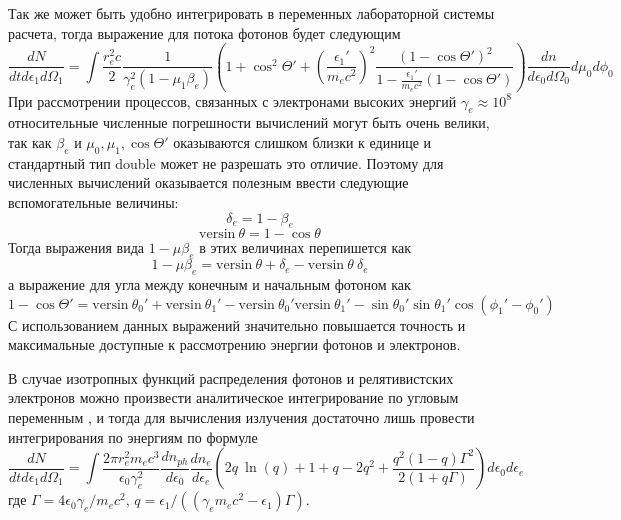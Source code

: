 Так же может быть удобно интегрировать в переменных лабораторной системы расчета, тогда выражение для потока фотонов будет следующим
\begin{equation}\label{compton_labframe}
	\frac{dN}{dt d\epsilon_1 d\Omega_1}=\int \frac{r_e^2 c}{2} \frac{1}{\gamma_e^2(1-\mu_1\beta_e)} (1 + \cos^2\Theta'+(\frac{\epsilon_1'}{m_e c^2})^2\frac{(1-\cos\Theta')^2}{1-\frac{\epsilon_1'}{m_e c^2}(1 - \cos \Theta')})\frac{dn}{d\epsilon_0 d\Omega_0}d\mu_0 d\phi_0
\end{equation}
При рассмотрении процессов, связанных с электронами высоких энергий $\gamma_e \approx 10^8$ относительные численные погрешности вычислений могут быть очень велики, так как $\beta_e$ и $\mu_0, \mu_1, \cos \Theta'$ оказываются слишком близки к единице и стандартный тип double может не разрешать это отличие. Поэтому для численных вычислений оказывается полезным ввести следующие вспомогательные величины:
\begin{equation}
	\delta_e = 1 - \beta_e
\end{equation}
\begin{equation}
	\text{versin}~\theta = 1 - \cos \theta
\end{equation}
Тогда выражения вида $1 - \mu \beta_e$ в этих величинах перепишется как
\begin{equation}
	1 - \mu \beta_e =\text{versin}~\theta + \delta_e - \text{versin}~\theta~\delta_e
\end{equation}
а выражение для угла между конечным и начальным фотоном как
\begin{equation}
	1 - \cos \Theta' = \text{versin}~\theta_0' + \text{versin}~\theta_1' - \text{versin}~ \theta_0' \text{versin}~\theta_1' - \sin \theta_0'\sin \theta_1' \cos(\phi_1'-\phi_0')
\end{equation}
С использованием данных выражений значительно повышается точность и максимальные доступные к рассмотрению энергии фотонов и электронов.

В случае изотропных функций распределения фотонов и релятивистских электронов можно произвести аналитическое интегрирование по угловым переменным \cite{JonesCompton, BykovUvarov2000}, и тогда для вычисления излучения достаточно лишь провести интегрирования по энергиям по формуле
\begin{equation}
	\frac{dN}{dt d\epsilon_1 d\Omega_1}=\int \frac{2 \pi r_e^2 m_e c^3 }{\epsilon_0 \gamma_e^2} \frac{dn_{ph}}{d\epsilon_0}\frac{dn_e}{d\epsilon_e}(2 q~ \ln(q)+1+q-2q^2+\frac{q^2(1-q)\Gamma^2}{2(1+q\Gamma)})d\epsilon_0d\epsilon_e
\end{equation}
где $\Gamma=4\epsilon_0\gamma_e/m_e c^2$, $q=\epsilon_1/((\gamma_e m_e c^2-\epsilon_1)\Gamma)$.
